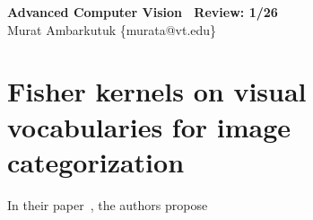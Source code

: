 \documentclass[11pt]{article}
\begin{document}
\thispagestyle{empty}
\begin{center}
	\textbf{\huge{Advanced Computer Vision \textemdash~Review: 1/26}} \\
	\bigskip
	\large{Murat Ambarkutuk \{murata@vt.edu\}}
\end{center}
\section{Fisher kernels on visual vocabularies for image categorization}
In their paper~\cite{perronnin2007fisher}, the authors propose



\end{document}
